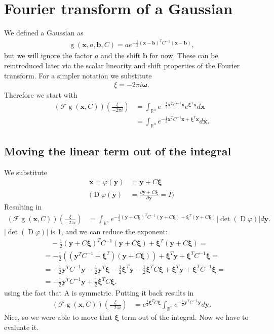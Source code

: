 \documentclass{paper}
\newcommand{\abs}[1]{\left| #1 \right|}
\newcommand{\F}{\ensuremath{\mathcal{F}}}
\newcommand{\vr}[1]{\ensuremath{\boldsymbol{#1}}}
\newcommand{\f}[1]{\operatorname{#1}}
\newcommand{\omegavec}[0]{\ensuremath{\vr{\omega{}}}}
\newcommand{\xivec}[0]{\ensuremath{\vr{\xi{}}}}
\newcommand{\yvec}[0]{\ensuremath{\vr{y}}}
\begin{document}
\section{Fourier transform of a Gaussian}
We defined a Gaussian as 
\begin{align*}
	\f{g}(\vr{x}, a, \vr{b}, C) = a e^{-\frac{1}{2}(\vr{x}-\vr{b})^T C^{-1}(\vr{x}-\vr{b})},
\end{align*}
but we will ignore the factor $a$ and the shift $\vr{b}$ for now.
These can be reintroduced later via the scalar linearity and shift properties of the Fourier transform.
For a simpler notation we substitute
\begin{align*}
	\xi = -2 \pi i \omegavec.
\end{align*}
Therefore we start with
\begin{align*}
	(\F\f{g}(\vr{x}, C))(\frac{\xi}{-2 \pi i}) &= \int_{\mathbb{R}^n} e^{-\frac{1}{2} \vr{x}^T C^{-1} \vr{x}} e^{\vr{\xi}^T \vr{x}} d\vr{x} \\
	&= \int_{\mathbb{R}^n} e^{-\frac{1}{2} \vr{x}^T C^{-1} \vr{x} + \vr{\xi}^T \vr{x}} d\vr{x}.
\end{align*}

\subsection{Moving the linear term out of the integral}
We substitute
\begin{align*}
	\vr{x} = \varphi(\vr{y}) &= \vr{y} + C\vr{\xi} \\
	\Bigg( \f{D}\varphi(\yvec) &= \frac{\partial \vr{y} + C\vr{\xi}}{\partial \vr{y}} = I \Bigg)
\end{align*}
Resulting in
\begin{align*}
	(\F\f{g}(\vr{x}, C))(\frac{\xi}{-2 \pi i})
	&= \int_{\mathbb{R}^n} e^{-\frac{1}{2} (\yvec + C\xivec)^T C^{-1} (\yvec + C\xivec) + \xivec^T (\yvec + C\xivec)} \abs{\f{det}(\f{D}\varphi)} d\yvec.
\end{align*}
$\abs{\f{det}(\f{D}\varphi)}$ is 1, and we can reduce the exponent:
\begin{align*}
	&\quad -\frac{1}{2} (\yvec + C\xivec)^T C^{-1} (\yvec + C\xivec) + \xivec^T (\yvec + C\xivec) = \\
	&= -\frac{1}{2} \left( (\yvec^T C^{-1} + \xivec^T)(\yvec + C \xivec) \right) + \xivec^T \yvec + \xivec^T C^{-1} \xivec = \\
	&= -\frac{1}{2} \yvec^T C^{-1} \yvec - \frac{1}{2} \yvec^T \xivec -\frac{1}{2} \xivec^T \yvec -\frac{1}{2} \xivec^T C \xivec + \xivec^T \yvec + \xivec^T C^{-1} \xivec = \\
	&= -\frac{1}{2} \yvec^T C^{-1} \yvec + \frac{1}{2} \xivec^T C \xivec.
\end{align*}
using the fact that A is symmetric.
Putting it back results in
\begin{align}
	\label{eq:fourier_only_gauss_int_left}
	(\F\f{g}(\vr{x}, C))(\frac{\xi}{-2 \pi i})
	&= e^{\frac{1}{2} \xivec^T C \xivec} \int_{\mathbb{R}^n} e^{-\frac{1}{2} \yvec^T C^{-1} \yvec}  d\yvec.
\end{align}
Nice, so we were able to move that $\xivec$ term out of the integral.
Now we have to evaluate it.
\end{document}
